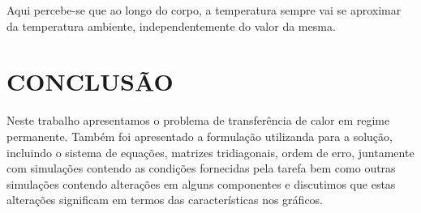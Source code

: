 \documentclass[a4paper, 12pt]{article}
\begin{document}
Aqui percebe-se que ao longo do corpo, a temperatura sempre vai se aproximar da temperatura ambiente, independentemente do valor da mesma.

\section{CONCLUSÃO}

Neste trabalho apresentamos o problema de transferência de calor em regime 
permanente. Também foi apresentado a formulação utilizanda para a solução, incluindo o sistema de equações, matrizes tridiagonais, ordem de erro, juntamente com simulações contendo as condições fornecidas pela tarefa bem como outras simulações contendo alterações em alguns componentes e discutimos que estas alterações significam em termos das características nos gráficos. 
\end{document}
